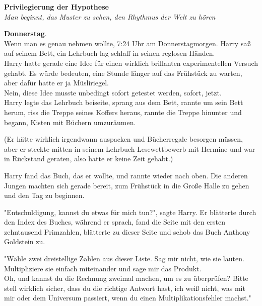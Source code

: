 

\hypertarget{privilegierung-der-hypothese}{%

\textbf{Privilegierung der Hypothese}\\

\emph{Man beginnt, das Muster zu sehen, den Rhythmus der Welt zu hören}

\textbf{Donnerstag}.\\ Wenn man es genau nehmen wollte, 7:24 Uhr am Donnerstagmorgen. Harry saß auf seinem Bett, ein Lehrbuch lag schlaff in seinen reglosen Händen.\\ Harry hatte gerade eine Idee für einen wirklich brillanten experimentellen Versuch gehabt. Es würde bedeuten, eine Stunde länger auf das Frühstück zu warten, aber dafür hatte er ja Müsliriegel.\\ Nein, diese Idee musste unbedingt sofort getestet werden, sofort, jetzt.\\ Harry legte das Lehrbuch beiseite, sprang aus dem Bett, rannte um sein Bett herum, riss die Treppe seines Koffers heraus, rannte die Treppe hinunter und begann, Kisten mit Büchern umzuräumen.

(Er hätte wirklich irgendwann auspacken und Bücherregale besorgen müssen, aber er steckte mitten in seinem Lehrbuch-Lesewettbewerb mit Hermine und war in Rückstand geraten, also hatte er keine Zeit gehabt.)

Harry fand das Buch, das er wollte, und rannte wieder nach oben. Die anderen Jungen machten sich gerade bereit, zum Frühstück in die Große Halle zu gehen und den Tag zu beginnen.

"Entschuldigung, kannst du etwas für mich tun?", sagte Harry. Er blätterte durch den Index des Buches, während er sprach, fand die Seite mit den ersten zehntausend Primzahlen, blätterte zu dieser Seite und schob das Buch Anthony Goldstein zu.

"Wähle zwei dreistellige Zahlen aus dieser Liste. Sag mir nicht, wie sie lauten. Multipliziere sie einfach miteinander und sage mir das Produkt.\\ Oh, und kannst du die Rechnung zweimal machen, um es zu überprüfen? Bitte stell wirklich sicher, dass du die richtige Antwort hast, ich weiß nicht, was mit mir oder dem Universum passiert, wenn du einen Multiplikationsfehler machst."

}
